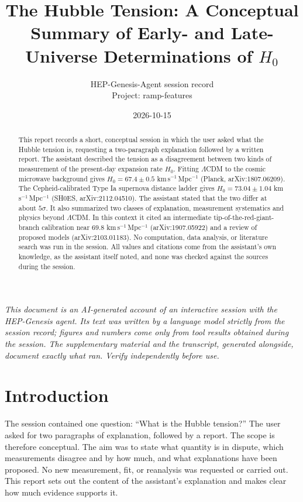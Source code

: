 \documentclass[11pt,a4paper]{article}
\title{The Hubble Tension: A Conceptual Summary of Early- and Late-Universe Determinations of $H_0$}
\author{HEP-Genesis-Agent session record \\ \small Project: ramp-features}
\date{2026-10-15}
\begin{document}
\maketitle
\noindent\textit{\small This document is an AI-generated account of an interactive session with the HEP-Genesis agent. Its text was written by a language model strictly from the session record; figures and numbers come only from tool results obtained during the session. The supplementary material and the transcript, generated alongside, document exactly what ran. Verify independently before use.}
\vspace{1em}

\begin{abstract}
This report records a short, conceptual session in which the user asked what the Hubble tension is, requesting a two-paragraph explanation followed by a written report. The assistant described the tension as a disagreement between two kinds of measurement of the present-day expansion rate $H_0$. Fitting $\Lambda$CDM to the cosmic microwave background gives $H_0 = 67.4 \pm 0.5$ km\,s$^{-1}$\,Mpc$^{-1}$ (Planck, arXiv:1807.06209). The Cepheid-calibrated Type Ia supernova distance ladder gives $H_0 = 73.04 \pm 1.04$ km\,s$^{-1}$\,Mpc$^{-1}$ (SH0ES, arXiv:2112.04510). The assistant stated that the two differ at about $5\sigma$. It also summarized two classes of explanation, measurement systematics and physics beyond $\Lambda$CDM. In this context it cited an intermediate tip-of-the-red-giant-branch calibration near $69.8$ km\,s$^{-1}$\,Mpc$^{-1}$ (arXiv:1907.05922) and a review of proposed models (arXiv:2103.01183). No computation, data analysis, or literature search was run in the session. All values and citations come from the assistant's own knowledge, as the assistant itself noted, and none was checked against the sources during the session.
\end{abstract}

\section{Introduction}
The session contained one question: ``What is the Hubble tension?'' The user asked for two paragraphs of explanation, followed by a report. The scope is therefore conceptual. The aim was to state what quantity is in dispute, which measurements disagree and by how much, and what explanations have been proposed. No new measurement, fit, or reanalysis was requested or carried out. This report sets out the content of the assistant's explanation and makes clear how much evidence supports it.
\end{document}
